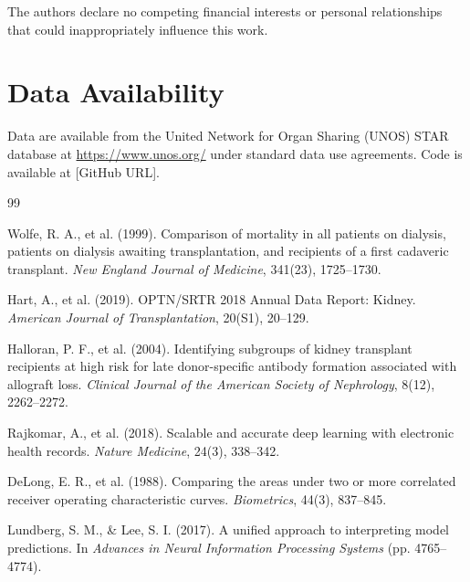 \documentclass[11pt,a4paper]{article}
\begin{document}
The authors declare no competing financial interests or personal relationships that could inappropriately influence this work.

\section*{Data Availability}

Data are available from the United Network for Organ Sharing (UNOS) STAR database at \url{https://www.unos.org/} under standard data use agreements. Code is available at [GitHub URL].

\begin{thebibliography}{99}

 Wolfe, R. A., et al. (1999). Comparison of mortality in all patients on dialysis, patients on dialysis awaiting transplantation, and recipients of a first cadaveric transplant. \textit{New England Journal of Medicine}, 341(23), 1725--1730.

 Hart, A., et al. (2019). OPTN/SRTR 2018 Annual Data Report: Kidney. \textit{American Journal of Transplantation}, 20(S1), 20--129.

 Halloran, P. F., et al. (2004). Identifying subgroups of kidney transplant recipients at high risk for late donor-specific antibody formation associated with allograft loss. \textit{Clinical Journal of the American Society of Nephrology}, 8(12), 2262--2272.

 Rajkomar, A., et al. (2018). Scalable and accurate deep learning with electronic health records. \textit{Nature Medicine}, 24(3), 338--342.

 DeLong, E. R., et al. (1988). Comparing the areas under two or more correlated receiver operating characteristic curves. \textit{Biometrics}, 44(3), 837--845.

 Lundberg, S. M., \& Lee, S. I. (2017). A unified approach to interpreting model predictions. In \textit{Advances in Neural Information Processing Systems} (pp. 4765--4774).

\end{thebibliography}

\appendix
\end{document}
